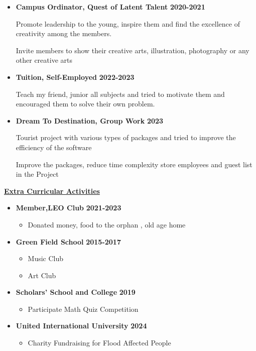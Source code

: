 \documentclass[12pt]{article}
\begin{document}
	\begin{itemize}
		\item \textbf{Campus Ordinator, Quest of Latent Talent} \hfill \textbf{2020-2021} \par
		Promote leadership to the young, inspire them and find the excellence of creativity among the members.\par
		Invite members to show their creative arts, illustration, photography or any other creative arts                  
		\item \textbf{Tuition, Self-Employed} \hfill \textbf{2022-2023}\par
		Teach my friend, junior all subjects and tried to motivate them and encouraged them to solve their own problem.
		\item \textbf{Dream To Destination, Group Work} \hfill \textbf{2023}\par
		Tourist project with various types of packages and tried to improve the efficiency of the software \par
		Improve the packages, reduce time complexity store employees and guest list in the Project
		
		
	\end{itemize} 
	
	\begin{large}
		\underline {\textbf{Extra Curricular Activities}} 
	\end{large}
	
	\begin{itemize}
		\item \textbf{Member,LEO Club} \hfill \textbf{2021-2023}
		\begin{itemize}
			\item Donated money, food to the orphan , old age home
		\end{itemize}
		\item \textbf{Green Field School} \hfill \textbf{2015-2017}
		\begin{itemize}
			\item Music Club
			\item Art Club
		\end{itemize}
		\item \textbf{Scholars' School and College} \hfill \textbf{2019}
		\begin{itemize}
			\item Participate Math Quiz Competition
		\end{itemize}
		\item \textbf{United International University} \hfill \textbf{2024}
		\begin{itemize}
			\item Charity Fundraising for Flood Affected People
		\end{itemize}
	\end{itemize}
	
\end{document}
